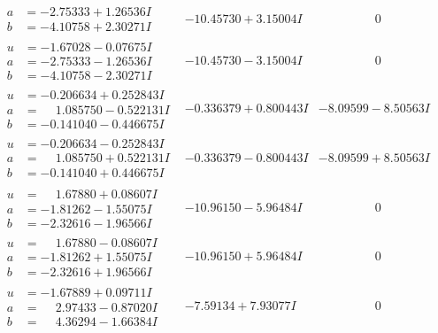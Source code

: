 \documentclass[1p]{elsarticle_modified}
\theoremstyle{definition}
\begin{document}
$$\begin{array}{c|c|c}
\begin{aligned}
a &= -2.75333 + 1.26536 I \\
b &= -4.10758 + 2.30271 I\end{aligned}
 & -10.45730 + 3.15004 I & \phantom{-0.000000 } 0 \\ \hline\begin{aligned}
u &= -1.67028 - 0.07675 I \\
a &= -2.75333 - 1.26536 I \\
b &= -4.10758 - 2.30271 I\end{aligned}
 & -10.45730 - 3.15004 I & \phantom{-0.000000 } 0 \\ \hline\begin{aligned}
u &= -0.206634 + 0.252843 I \\
a &= \phantom{-}1.085750 - 0.522131 I \\
b &= -0.141040 - 0.446675 I\end{aligned}
 & -0.336379 + 0.800443 I & -8.09599 - 8.50563 I \\ \hline\begin{aligned}
u &= -0.206634 - 0.252843 I \\
a &= \phantom{-}1.085750 + 0.522131 I \\
b &= -0.141040 + 0.446675 I\end{aligned}
 & -0.336379 - 0.800443 I & -8.09599 + 8.50563 I \\ \hline\begin{aligned}
u &= \phantom{-}1.67880 + 0.08607 I \\
a &= -1.81262 - 1.55075 I \\
b &= -2.32616 - 1.96566 I\end{aligned}
 & -10.96150 - 5.96484 I & \phantom{-0.000000 } 0 \\ \hline\begin{aligned}
u &= \phantom{-}1.67880 - 0.08607 I \\
a &= -1.81262 + 1.55075 I \\
b &= -2.32616 + 1.96566 I\end{aligned}
 & -10.96150 + 5.96484 I & \phantom{-0.000000 } 0 \\ \hline\begin{aligned}
u &= -1.67889 + 0.09711 I \\
a &= \phantom{-}2.97433 - 0.87020 I \\
b &= \phantom{-}4.36294 - 1.66384 I\end{aligned}
 & -7.59134 + 7.93077 I & \phantom{-0.000000 } 0 \\ \hline\begin{aligned}

\end{aligned}
\end{array}$$
\end{document}
